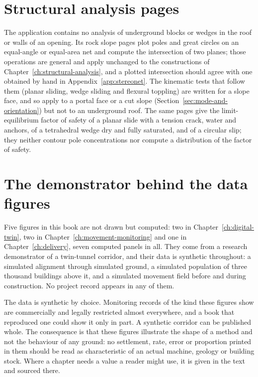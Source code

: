 \section{Structural analysis pages}
\label{sec:structural-scripts}

The application contains no analysis of underground blocks or wedges in the
roof or walls of an opening. Its rock slope pages plot poles and great circles
on an equal-angle or equal-area net and compute the intersection of two
planes; those operations are general and apply unchanged to the constructions
of Chapter~\ref{ch:structural-analysis}, and a plotted intersection should
agree with one obtained by hand in Appendix~\ref{app:stereonet}. The kinematic
tests that follow them (planar sliding, wedge sliding and flexural
toppling) are written for a slope face, and so apply to a portal face or a
cut slope (Section~\ref{sec:mode-and-orientation}) but not to an underground
roof. The same pages give the limit-equilibrium factor of safety of a planar
slide with a tension crack, water and anchors, of a tetrahedral wedge dry and
fully saturated, and of a circular slip; they neither contour pole
concentrations nor compute a distribution of the factor of safety.

\section{The demonstrator behind the data figures}
\label{sec:demonstrator-figures}

Five figures in this book are not drawn but computed: two in
Chapter~\ref{ch:digital-twin}, two in Chapter~\ref{ch:movement-monitoring} and
one in Chapter~\ref{ch:delivery}, seven computed panels in all. They come from a research demonstrator of a
twin-tunnel corridor, and their data is synthetic throughout: a simulated
alignment through simulated ground, a simulated population of three thousand
buildings above it, and a simulated movement field before and during
construction. No project record appears in any of them.

The data is synthetic by choice. Monitoring records of the
kind these figures show are commercially and legally restricted almost
everywhere, and a book that reproduced one could show it only in part. A
synthetic corridor can be published whole. The
consequence is that these figures illustrate the shape of a method and not the
behaviour of any ground: no settlement, rate, error or proportion printed in
them should be read as characteristic of an actual machine, geology or
building stock. Where a chapter needs a value a reader might use, it is
given in the text and sourced there.

